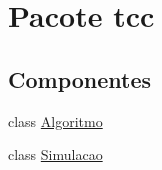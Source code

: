 \hypertarget{namespacetcc}{\section{Pacote tcc}
\label{namespacetcc}
}
\subsection*{Componentes}
\begin{DoxyCompactItemize}
\item 
class \hyperlink{classtcc_1_1_algoritmo}{Algoritmo}
\item 
class \hyperlink{classtcc_1_1_simulacao}{Simulacao}
\end{DoxyCompactItemize}
